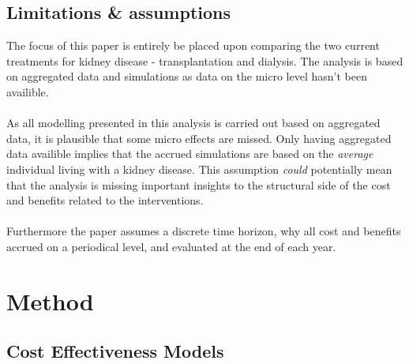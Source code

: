 \documentclass[a4paper,12pt]{article}
\begin{document}
\subsection{Limitations \& assumptions}

The focus of this paper is entirely be placed upon comparing the two current treatments for kidney disease - transplantation and dialysis. The analysis is based on aggregated data and simulations as data on the micro level hasn't been availible.
\\\\
As all modelling presented in this analysis is carried out based on aggregated data, it is plausible that some micro effects are missed. Only having aggregated data availible implies that the accrued simulations are based on the \textit{average} individual living with a kidney disease. This assumption \textit{could} potentially mean that the analysis is missing important insights to the structural side of the cost and benefits related to the interventions.
\\\\
Furthermore the paper assumes a discrete time horizon, why all cost and benefits accrued on a periodical level, and evaluated at the end of each year.


\section{Method}

\subsection{Cost Effectiveness Models}
\end{document}
